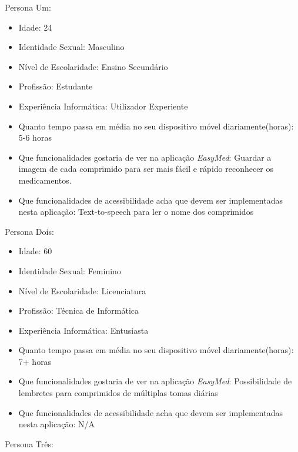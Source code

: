 \documentclass[a4paper]{article}
\begin{document}
\begin{center}
Persona Um:
\end{center}

\begin{itemize}
    \item Idade: 24
    \item Identidade Sexual: Masculino
    \item Nível de Escolaridade: Ensino Secundário
    \item Profissão: Estudante
    \item Experiência Informática: Utilizador Experiente
    \item Quanto tempo passa em média no seu dispositivo móvel diariamente(horas): 5-6 horas
    \item Que funcionalidades gostaria de ver na aplicação \textit{EasyMed}: Guardar a imagem de cada comprimido para ser mais fácil e rápido reconhecer os medicamentos.
    \item Que funcionalidades de acessibilidade acha que devem ser implementadas nesta aplicação: Text-to-speech para ler o nome dos comprimidos

\end{itemize}

\begin{center}
Persona Dois:
\end{center}

\begin{itemize}
    \item Idade: 60
    \item Identidade Sexual: Feminino
    \item Nível de Escolaridade: Licenciatura
    \item Profissão: Técnica de Informática
    \item Experiência Informática: Entusiasta
    \item Quanto tempo passa em média no seu dispositivo móvel diariamente(horas): 7+ horas
    \item Que funcionalidades gostaria de ver na aplicação \textit{EasyMed}: Possibilidade de lembretes para comprimidos de múltiplas tomas diárias
    \item Que funcionalidades de acessibilidade acha que devem ser implementadas nesta aplicação: N/A
\end{itemize}

\begin{center}
Persona Três:
\end{center}
\end{document}

